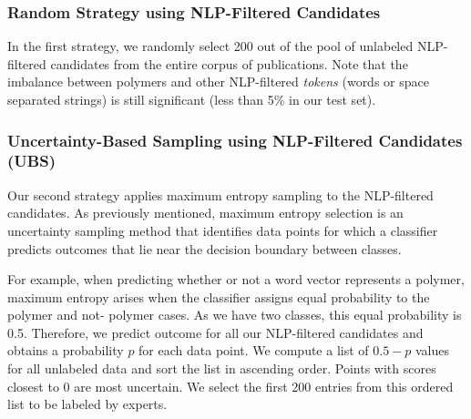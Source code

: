 \subsubsection{Random Strategy using NLP-Filtered Candidates}
In the first strategy, we randomly select 200 out of the pool of unlabeled NLP-filtered candidates from the entire corpus of publications.
Note that the imbalance between polymers and other NLP-filtered \textit{tokens} (words or space separated strings)  is still significant (less than 5\% in our test set).

\subsubsection{Uncertainty-Based Sampling using NLP-Filtered Candidates (UBS)}
Our second strategy applies maximum entropy sampling to the NLP-filtered candidates. %
As previously mentioned, maximum entropy selection is an uncertainty sampling method that
identifies data points for which a classifier predicts outcomes that lie near the decision boundary 
between classes. 

For example, when predicting whether or not a word vector represents a polymer, maximum entropy arises when the classifier assigns equal probability to the polymer and not-
polymer cases.
As we have two classes, this equal probability is 0.5.
Therefore, we predict outcome for all our NLP-filtered candidates and obtains a probability $p$ for each data point. We compute a list of $0.5-p$ values for all unlabeled data and sort the list in ascending order.
Points with scores closest to $0$ are most uncertain.
We select the first 200 entries from this ordered list to be labeled by experts.

